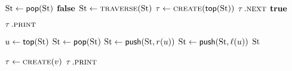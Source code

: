 \begin{algorithm*}[t]
\begin{varwidth}[t]{0.50\textwidth}
\begin{algorithmic}[1]
			\State
			
			\State $\operatorname{St}\gets\text{\sf pop}(\operatorname{St})$
			\State \Return $\bf{false}$
			\State $\operatorname{St}\gets\textsc{traverse}(\operatorname{St})$
			\EndIf
			\State $\operatorname{\tau} \gets \textsc{create}(\text{\sf top}(\operatorname{St}))$
			\State $\operatorname{\tau}.\textsc{next}$
			\EndIf
			\State \Return $\bf{true}$
			\EndProcedure
			
			\State
			
			\State $\operatorname{\tau}.\textsc{print}$
			\EndProcedure
			
			\State
			
			\State $u \gets \text{\sf top}(\operatorname{St})$
			\State $\operatorname{St} \gets \text{\sf pop}(\operatorname{St})$
			\State $\operatorname{St}\gets\text{\sf push}(\operatorname{St}, r(u))$
			\State $\operatorname{St}\gets\text{\sf push}(\operatorname{St}, \ell(u))$
			\EndWhile
			\State \Return $\operatorname{St}$
			\EndProcedure
			
			\State
			
			\State $\operatorname{\tau} \gets \textsc{create}(v)$
				\State $\operatorname{\tau}.\textsc{print}$
			\EndWhile
			\EndProcedure
		\end{algorithmic}
	\end{varwidth}
	\smallskip
\end{algorithm*}
